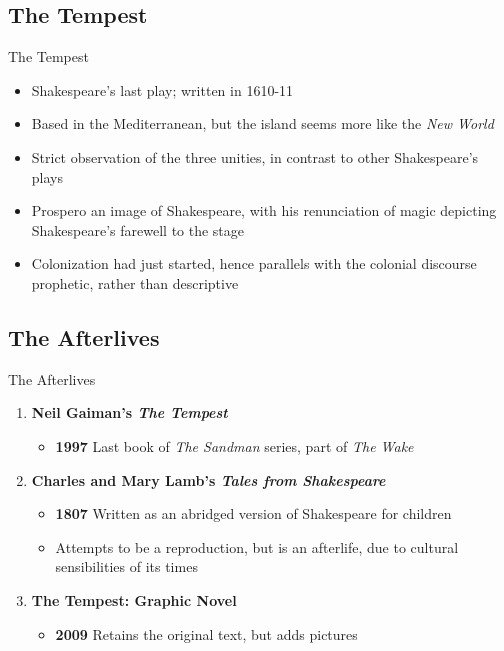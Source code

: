 \documentclass{beamer}
\begin{document}
\subsection{The Tempest}
\begin{frame}{The Tempest}
  \begin{itemize}
    \item Shakespeare's last play; written in 1610-11
    \item Based in the Mediterranean, but the island seems more like the \emph{New World}
    \item Strict observation of the three unities, in contrast to other Shakespeare's plays 
    \item Prospero an image of Shakespeare, with his renunciation of magic depicting Shakespeare's farewell to the stage
    \item Colonization had just started, hence parallels with the colonial discourse prophetic, rather than descriptive
  \end{itemize}
\end{frame}

\subsection{The Afterlives}
\begin{frame}{The Afterlives}
  \begin{enumerate}
  \item \textbf{Neil Gaiman's \emph{The Tempest}}
    \begin{itemize}
    \item \textbf{1997} Last book of \emph{The Sandman} series, part of \emph{The Wake}
    \end{itemize}
  \item \textbf{Charles and Mary Lamb's \emph{Tales from Shakespeare}}
    \begin{itemize}
    \item \textbf{1807} Written as an abridged version of Shakespeare for children
    \item Attempts to be a reproduction, but is an afterlife, due to cultural sensibilities of its times
    \end{itemize}
  \item \textbf{The Tempest: Graphic Novel}
    \begin{itemize}
    \item \textbf{2009} Retains the original text, but adds pictures
    \end{itemize}
  \end{enumerate}
\end{frame}
\end{document}
